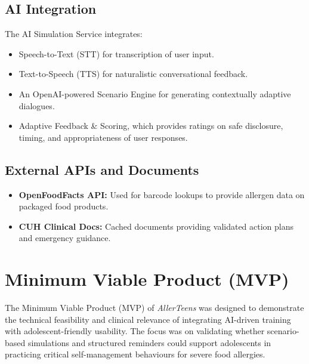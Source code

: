 \documentclass[MScCS]{uccthesis}
\begin{document}
\subsection{AI Integration}
The AI Simulation Service integrates:
\begin{itemize}
    \item Speech-to-Text (STT) for transcription of user input.
    \item Text-to-Speech (TTS) for naturalistic conversational feedback.
    \item An OpenAI-powered Scenario Engine for generating contextually adaptive dialogues.
    \item Adaptive Feedback \& Scoring, which provides ratings on safe disclosure, timing, and appropriateness of user responses.
\end{itemize}

\subsection{External APIs and Documents}
\begin{itemize}
    \item \textbf{OpenFoodFacts API:} Used for barcode lookups to provide allergen data on packaged food products.
    \item \textbf{CUH Clinical Docs:} Cached documents providing validated action plans and emergency guidance.
\end{itemize}





\section{Minimum Viable Product (MVP)}
The Minimum Viable Product (MVP) of \textit{AllerTeens} was designed to demonstrate the technical feasibility and clinical relevance of integrating AI-driven training with adolescent-friendly usability. The focus was on validating whether scenario-based simulations and structured reminders could support adolescents in practicing critical self-management behaviours for severe food allergies.  
\end{document}
